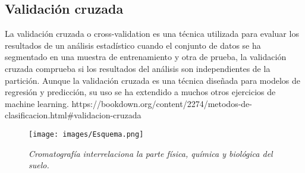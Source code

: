 \subsection{Validación cruzada}
La validación cruzada o cross-validation es una técnica utilizada para evaluar los resultados de un análisis estadístico cuando el conjunto de datos se ha segmentado en una muestra de entrenamiento y otra de prueba, la validación cruzada comprueba si los resultados del análisis son independientes de la partición. Aunque la validación cruzada es una técnica diseñada para modelos de regresión y predicción, su uso se ha extendido a muchos otros ejercicios de machine learning.
https://bookdown.org/content/2274/metodos-de-clasificacion.html#validacion-cruzada

\begin{figure}[H]
 \centering	
   \texttt{[image: images/Esquema.png]}
   \caption{\textit{Cromatografía interrelaciona la parte física, química y biológica del suelo.}}
   \end{figure}	


